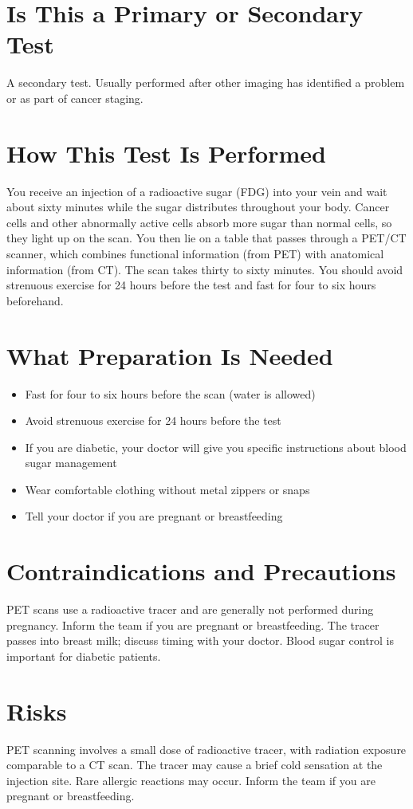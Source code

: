 \section*{Is This a Primary or Secondary Test}
A secondary test. Usually performed after other imaging has identified a problem or as part of cancer staging.

\section*{How This Test Is Performed}
You receive an injection of a radioactive sugar (FDG) into your vein and wait about sixty minutes while the sugar distributes throughout your body. Cancer cells and other abnormally active cells absorb more sugar than normal cells, so they light up on the scan. You then lie on a table that passes through a PET/CT scanner, which combines functional information (from PET) with anatomical information (from CT). The scan takes thirty to sixty minutes. You should avoid strenuous exercise for 24 hours before the test and fast for four to six hours beforehand.

\section*{What Preparation Is Needed}
\begin{itemize}
\item Fast for four to six hours before the scan (water is allowed)
\item Avoid strenuous exercise for 24 hours before the test
\item If you are diabetic, your doctor will give you specific instructions about blood sugar management
\item Wear comfortable clothing without metal zippers or snaps
\item Tell your doctor if you are pregnant or breastfeeding
\end{itemize}

\section*{Contraindications and Precautions}
PET scans use a radioactive tracer and are generally not performed during pregnancy. Inform the team if you are pregnant or breastfeeding. The tracer passes into breast milk; discuss timing with your doctor. Blood sugar control is important for diabetic patients.

\section*{Risks}
PET scanning involves a small dose of radioactive tracer, with radiation exposure comparable to a CT scan. The tracer may cause a brief cold sensation at the injection site. Rare allergic reactions may occur. Inform the team if you are pregnant or breastfeeding.

